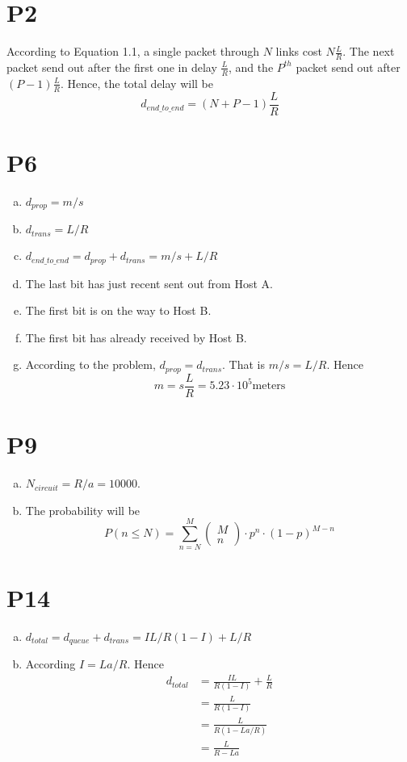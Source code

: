 \documentclass[a4paper, 11pt]{article}
\begin{document}
\section*{P2}
\hspace{14pt} According to Equation 1.1, a single packet through $N$ links cost $N \frac{L}{R}$. The next packet send out after the first one in delay $\frac{L}{R}$, and the $P^{th}$ packet send out after $(P - 1)\frac{L}{R}$. Hence, the total delay will be $$d_{end\_to\_end} = (N + P - 1)\frac{L}{R}$$
	
\section*{P6}
	\begin{enumerate}[a.]
		\item $d_{prop} = m / s$
		\item $d_{trans} = L / R$
		\item $d_{end\_to\_end} = d_{prop} + d_{trans} = m / s + L / R$
		\item The last bit has just recent sent out from Host A.
		\item The first bit is on the way to Host B.
		\item The first bit has already received by Host B.
		\item According to the problem, $d_{prop} = d_{trans}$. That is $m / s = L / R $. Hence $$ m = s \frac{L}{R} = 5.23 \cdot 10^5 \text{meters}$$
	\end{enumerate}
\section*{P9}
	\begin{enumerate}[a.]
		\item $N_{circuit} = R / a = 10000$.
		\item The probability will be $$P(n \leq N) = \sum_{n=N}^M \begin{pmatrix} M \\ n\end{pmatrix} \cdot p^n \cdot (1-p)^{M-n}$$
	\end{enumerate}
\section*{P14}
	\begin{enumerate}[a.]
		\item $d_{total} = d_{queue} + d_{trans} = IL/R(1-I) + L/R$
		\item According $I = La / R$. Hence 
		\begin{align*}
			d_{total} &= \frac{IL}{R(1-I)} + \frac{L}{R} \\
					  &= \frac{L}{R(1-I)} \\
					  &= \frac{L}{R(1-La / R)} \\
					  &= \frac{L}{R - La}
		\end{align*} 
	\end{enumerate}
\end{document}
